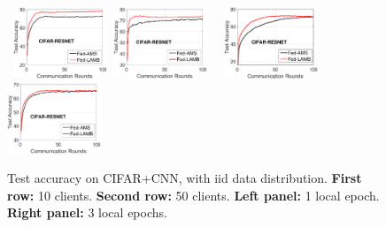 \documentclass{article}
\begin{document}
\begin{figure}[H]
    \begin{center}
        \mbox{
        \includegraphics[width=0.25\textwidth]{figure/cifar_testerror_resnet_ep1_client10_iid1.eps}
        \includegraphics[width=0.25\textwidth]{figure/cifar_testerror_resnet_ep3_client10_iid1.eps}
        }
        \mbox{
        \includegraphics[width=0.25\textwidth]{figure/cifar_testerror_resnet_ep1_client50_iid1.eps}
        \includegraphics[width=0.25\textwidth]{figure/cifar_testerror_resnet_ep3_client50_iid1.eps}
        }
    \end{center}
	\caption{Test accuracy on CIFAR+CNN, with iid data distribution. \textbf{First row:} 10 clients. \textbf{Second row:} 50 clients. \textbf{Left panel:} 1 local epoch. \textbf{Right panel:} 3 local epochs.}
	\label{fig:cifar-resnet-iid}
\end{figure}
\end{document}
